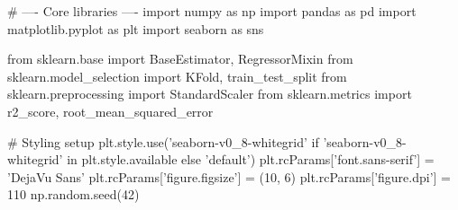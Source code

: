 
\begin{codebox}[title={Core libraries}]
# ---- Core libraries ----
import numpy as np
import pandas as pd
import matplotlib.pyplot as plt
import seaborn as sns

from sklearn.base import BaseEstimator, RegressorMixin
from sklearn.model_selection import KFold, train_test_split
from sklearn.preprocessing import StandardScaler
from sklearn.metrics import r2_score, root_mean_squared_error

# Styling setup
plt.style.use('seaborn-v0_8-whitegrid' if 'seaborn-v0_8-whitegrid' in plt.style.available else 'default')
plt.rcParams['font.sans-serif'] = 'DejaVu Sans'
plt.rcParams['figure.figsize'] = (10, 6)
plt.rcParams['figure.dpi'] = 110
np.random.seed(42)
\end{codebox}


